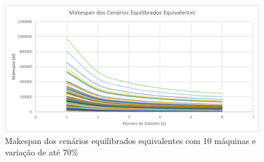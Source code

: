 \begin{figure}[!ht]
    \centering
    \includegraphics[width=12cm]{Resultados/Figuras/Meq10_70}
    \caption{Makespan dos cenários equilibrados equivalentes com 10 máquinas e variação de até 70\%}
    \label{fig:Meq10_70}
\end{figure}